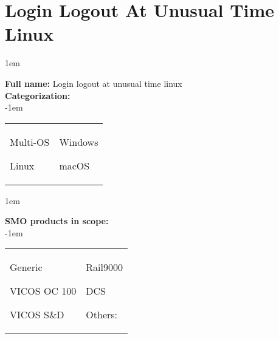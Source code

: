 
%
%

\section{Login Logout At Unusual Time Linux}
\label{15698}

\openup 1em

\textbf{Full name:} Login logout at unusual time linux\hrulefill \\
{\bf Categorization:} \\

\openup -1em
\vspace{-3em}

\begin{tabular}{p{}p{}}

\begin{todolist}
  	\item Multi-OS
	\item[\done] Linux
\end{todolist}
&
\begin{todolist}
	\item Windows
	\item macOS
\end{todolist}

\end{tabular}

\openup 1em

{\bf SMO products in scope:} \\

\openup -1em
\vspace{-3em}

\begin{tabular}{p{}p{}}

\begin{todolist}
  \item[\done] Generic
  \item VICOS OC 100
  \item VICOS S\&D
\end{todolist}
&
\begin{todolist}
  \item[\done] Rail9000
  \item DCS
  \item Others: \hrulefill
\end{todolist}

\end{tabular}

